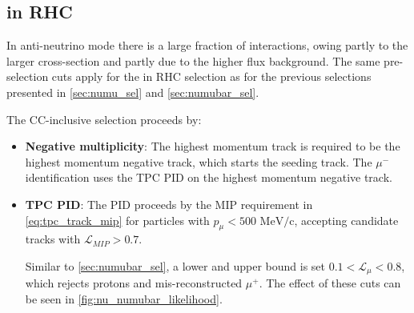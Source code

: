 \subsection{\numu in RHC}
\label{sec:numu_in_nubar_sel}
In anti-neutrino mode there is a large fraction of \numu interactions, owing partly to the larger \numu cross-section and partly due to the higher flux background. The same pre-selection cuts apply for the \numu in RHC selection as for the previous selections presented in \autoref{sec:numu_sel} and \autoref{sec:numubar_sel}.

The CC-inclusive selection proceeds by:
\begin{itemize}
	\item \textbf{Negative multiplicity}: The highest momentum track is required to be the highest momentum negative track, which starts the seeding track. The $\mu^-$ identification uses the TPC PID on the highest momentum negative track. 
	
	\item \textbf{TPC PID}: The PID proceeds by the MIP requirement in \autoref{eq:tpc_track_mip} for particles with $p_\mu < 500 \text{ MeV/c}$, accepting candidate tracks with $\mathcal{L}_{MIP} > 0.7$.
	
	Similar to \autoref{sec:numubar_sel}, a lower and upper bound is set $0.1 < \mathcal{L}_\mu < 0.8$, which rejects protons and mis-reconstructed $\mu^+$. The effect of these cuts can be seen in \autoref{fig:nu_numubar_likelihood}.
\end{itemize}

